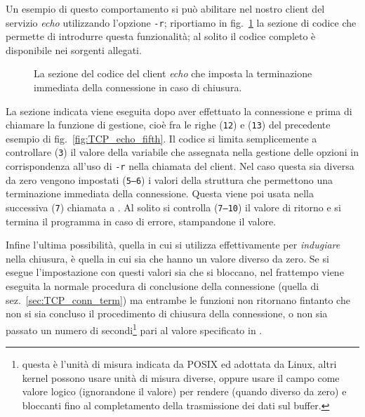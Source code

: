 Un esempio di questo comportamento si può abilitare nel nostro client del
servizio \textit{echo} utilizzando l'opzione \texttt{-r}; riportiamo in
fig.~\ref{fig:TCP_echo_sixth} la sezione di codice che permette di introdurre
questa funzionalità; al solito il codice completo è disponibile nei sorgenti
allegati.

\begin{figure}[!htbp] 
  \footnotesize \centering
  \begin{minipage}[c]{\codesamplewidth}
  \end{minipage}
  \normalsize
  \caption{La sezione del codice del client \textit{echo} che imposta la
    terminazione immediata della connessione in caso di chiusura.}
  \label{fig:TCP_echo_sixth}
\end{figure}

La sezione indicata viene eseguita dopo aver effettuato la connessione e prima
di chiamare la funzione di gestione, cioè fra le righe (\texttt{\small 12}) e
(\texttt{\small 13}) del precedente esempio di fig.~\ref{fig:TCP_echo_fifth}.
Il codice si limita semplicemente a controllare (\texttt{\small 3}) il
valore della variabile  che assegnata nella gestione delle opzioni
in corrispondenza all'uso di \texttt{-r} nella chiamata del client. Nel caso
questa sia diversa da zero vengono impostati (\texttt{\small 5--6}) i valori
della struttura  che permettono una terminazione immediata della
connessione. Questa viene poi usata nella successiva (\texttt{\small 7})
chiamata a . Al solito si controlla (\texttt{\small 7--10})
il valore di ritorno e si termina il programma in caso di errore, stampandone
il valore.

Infine l'ultima possibilità, quella in cui si utilizza effettivamente
 per \textsl{indugiare} nella chiusura, è quella in cui sia
 che  hanno un valore diverso da zero. Se si
esegue l'impostazione con questi valori sia  che 
si bloccano, nel frattempo viene eseguita la normale procedura di conclusione
della connessione (quella di sez.~\ref{sec:TCP_conn_term}) ma entrambe le
funzioni non ritornano fintanto che non si sia concluso il procedimento di
chiusura della connessione, o non sia passato un numero di
secondi\footnote{questa è l'unità di misura indicata da POSIX ed adottata da
  Linux, altri kernel possono usare unità di misura diverse, oppure usare il
  campo  come valore logico (ignorandone il valore) per rendere
  (quando diverso da zero)  e  bloccanti fino al
  completamento della trasmissione dei dati sul buffer.}  pari al valore
specificato in .

